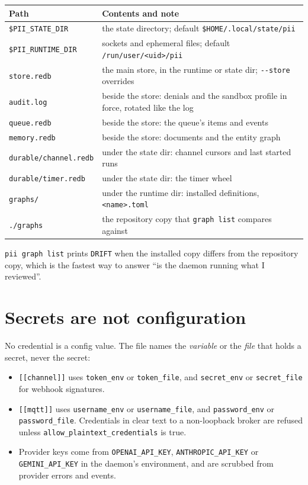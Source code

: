 \begin{center}
\begin{tabular}{@{}>{\raggedright\arraybackslash}p{}>{\raggedright\arraybackslash}p{}@{}}
  \toprule
  \textbf{Path} & \textbf{Contents and note} \\
  \midrule
  \texttt{\$PII\_STATE\_DIR} & the state directory; default
    \texttt{\$HOME/.local/state/pii} \\
  \texttt{\$PII\_RUNTIME\_DIR} & sockets and ephemeral files; default
    \texttt{/run/user/<uid>/pii} \\
  \texttt{store.redb} & the main store, in the runtime or state dir; \texttt{-{}-store}
    overrides \\
  \texttt{audit.log} & beside the store: denials and the sandbox profile in force, rotated
    like the log \\
  \texttt{queue.redb} & beside the store: the queue's items and events \\
  \texttt{memory.redb} & beside the store: documents and the entity graph \\
  \texttt{durable/channel.redb} & under the state dir: channel cursors and last started runs \\
  \texttt{durable/timer.redb} & under the state dir: the timer wheel \\
  \texttt{graphs/} & under the runtime dir: installed definitions, \texttt{<name>.toml} \\
  \texttt{./graphs} & the repository copy that \texttt{graph list} compares against \\
  \bottomrule
\end{tabular}
\end{center}

\texttt{pii graph list} prints \texttt{DRIFT} when the installed copy differs from the
repository copy, which is the fastest way to answer \enquote{is the daemon running what I
reviewed}.

\section{Secrets are not configuration}

No credential is a config value. The file names the \emph{variable} or the \emph{file} that
holds a secret, never the secret:

\begin{itemize}
  \item \texttt{[[channel]]} uses \texttt{token\_env} or \texttt{token\_file}, and
    \texttt{secret\_env} or \texttt{secret\_file} for webhook signatures.
  \item \texttt{[[mqtt]]} uses \texttt{username\_env} or \texttt{username\_file}, and
    \texttt{password\_env} or \texttt{password\_file}. Credentials in clear text to a
    non-loopback broker are refused unless \texttt{allow\_plaintext\_credentials} is true.
  \item Provider keys come from \texttt{OPENAI\_API\_KEY}, \texttt{ANTHROPIC\_API\_KEY} or
    \texttt{GEMINI\_API\_KEY} in the daemon's environment, and are scrubbed from provider
    errors and events.
\end{itemize}

